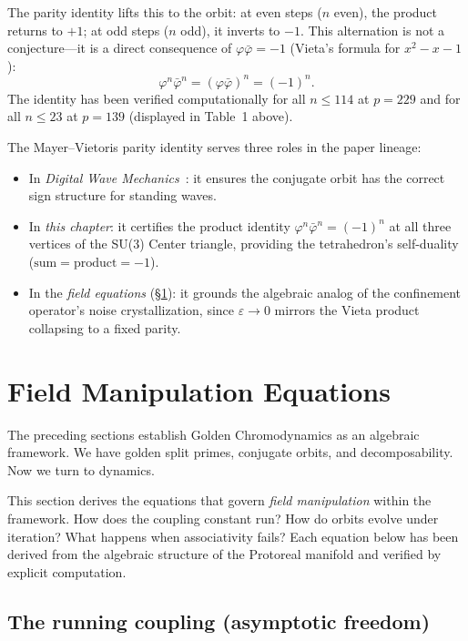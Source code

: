 The parity identity lifts this to the orbit:
at even steps ($n$ even), the product returns to $+1$;
at odd steps ($n$ odd), it inverts to $-1$.
This alternation is not a conjecture---it is a direct consequence
of $\varphi \bar\varphi = -1$ (Vieta's formula for $x^2 - x - 1$):
\[
\varphi^n \bar\varphi^n = (\varphi \bar\varphi)^n = (-1)^n.
\]
The identity has been verified computationally for all $n \leq 114$
at $p = 229$ and for all $n \leq 23$ at $p = 139$
(displayed in Table~1 above).

The Mayer--Vietoris parity identity serves three roles in the
paper lineage:
\begin{itemize}
\item In \emph{Digital Wave Mechanics}~\cite{lockwood_larue_dwm, dwm}: it ensures the
  conjugate orbit has the correct sign structure for standing waves.
\item In \emph{this chapter}: it certifies the product identity
  $\varphi^n \bar\varphi^n = (-1)^n$ at all three vertices of the
  SU(3) Center triangle, providing the tetrahedron's
  self-duality ($\text{sum} = \text{product} = -1$).
\item In the \emph{field equations} (\S\ref{sec:field_equations}):
  it grounds the algebraic analog of the confinement operator's noise
  crystallization, since $\varepsilon \to 0$ mirrors the Vieta product
  collapsing to a fixed parity.
\end{itemize}

\section{Field Manipulation Equations}
\label{sec:field_equations}

The preceding sections establish Golden Chromodynamics as an algebraic framework. We have golden split primes, conjugate orbits, and decomposability. Now we turn to dynamics.

This section derives the equations that govern \emph{field manipulation} within the framework. How does the coupling constant run? How do orbits evolve under iteration? What happens when associativity fails? Each equation below has been derived from the algebraic structure of the Protoreal manifold and verified by explicit computation.

\subsection{The running coupling (asymptotic freedom)}

